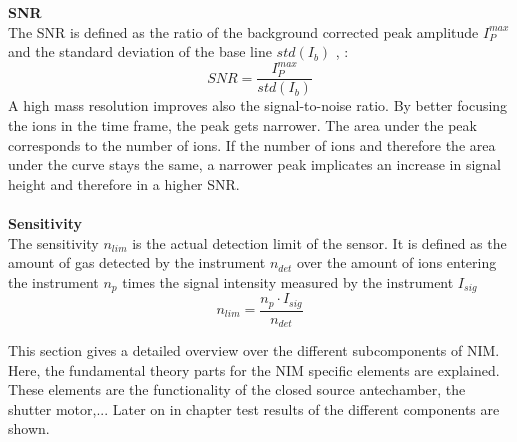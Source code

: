 	\textbf{SNR}\\ %
	The SNR is defined as the ratio of the background corrected peak amplitude $I^{max}_P$ and the standard deviation of the base line $std(I_b)$ \cite{Agilent_TechNote_SNR}, \cite{Master_Meyer}: %
	\begin{equation}
		SNR = \frac{I^{max}_P}{std(I_b)}
		\label{eq:SNR}
	\end{equation}
	A high mass resolution improves also the signal-to-noise ratio. By better focusing the ions in the time frame, the peak gets narrower. The area under the peak corresponds to the number of ions. If the number of ions and therefore the area under the curve stays the same, a narrower peak implicates an increase in signal height and therefore in a higher SNR.\\ %
	\\
	\textbf{Sensitivity} \\ %
	The sensitivity $n_{lim}$ is the actual detection limit of the sensor. It is defined as the amount of gas detected by the instrument $n_{det}$ over the amount of ions entering the instrument $n_{p}$ times the signal intensity measured by the instrument $I_{sig}$
	\begin{equation}
		n_{lim} = \frac{n_p \cdot I_{sig}}{n_{det}}
	\end{equation}
	
	

	
	This section gives a detailed overview over the different subcomponents of NIM. Here, the fundamental theory parts for the NIM specific elements are explained. These elements are the functionality of the closed source antechamber, the shutter motor,...
	Later on in chapter  test results of the different components are shown.
	
